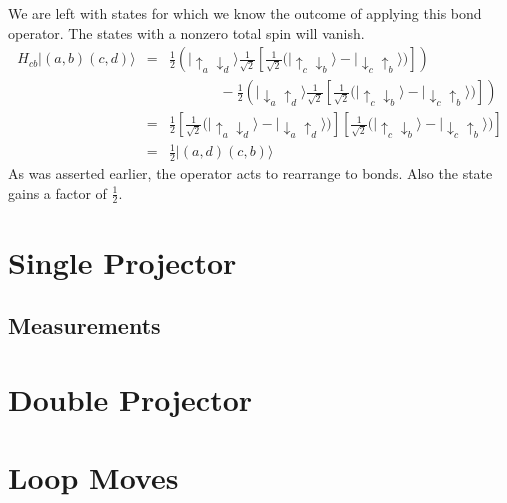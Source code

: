 We are left with states for which we know the outcome of applying this bond operator.
The states with a nonzero total spin will vanish.
\begin{eqnarray}
H_{cb}\lvert(a,b)(c,d)\rangle &=&
	     \tfrac{1}{2}\left( \lvert\uparrow_a \downarrow_d \rangle 
	     \tfrac{1}{ \sqrt{2}} \left[ 
	     	\tfrac{1}{ \sqrt{2}} \big(
	     	\lvert \uparrow_c \downarrow_b \rangle - \lvert \downarrow_c \uparrow_b \rangle 
	     \big)
	     \right]
	     \right) \nonumber \\    
	   && \;\; \;\;\;\;\;\; \;\;\;\;\;
	    - 	     \tfrac{1}{2} \left( \lvert\downarrow_a \uparrow_d \rangle 
	     \tfrac{1}{ \sqrt{2}} \left[ 
	     	\tfrac{1}{ \sqrt{2}} \big(
	     	\lvert \uparrow_c \downarrow_b \rangle - \lvert \downarrow_c \uparrow_b \rangle 
	     \big)
	     \right]
	     \right) \nonumber \\
	     &=&  \tfrac{1}{2} \left[ \tfrac{1}{ \sqrt{2}} 
	     \big( \lvert\uparrow_a \downarrow_d \rangle - \lvert\downarrow_a \uparrow_d \rangle  
	     \big)\right]
	     \left[ \tfrac{1}{ \sqrt{2}} 
	     \big( \lvert\uparrow_c \downarrow_b \rangle - \lvert\downarrow_c \uparrow_b \rangle  
	     \big)\right] \\
	     &=& \tfrac{1}{2} \lvert(a,d)(c,b)\rangle \nonumber
\end{eqnarray}
As was asserted earlier, the operator acts to rearrange to bonds.
Also the state gains a factor of $\frac{1}{2}$.


\section{Single Projector}
\subsection{Measurements}
\section{Double Projector}
\section{Loop Moves}
